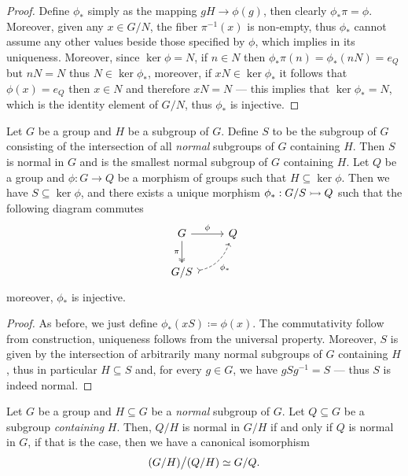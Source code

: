 \begin{proof}
Define \(\phi_{*}\) simply as the mapping \(gH \to \phi(g)\), then clearly
\(\phi_{*} \pi = \phi\). Moreover, given any \(x \in G/N\), the fiber
\(\pi^{-1}(x)\) is non-empty, thus \(\phi_{*}\) cannot assume any other values
beside those specified by \(\phi\), which implies in its uniqueness. Moreover,
since \(\ker \phi = N\), if \(n \in N\) then \(\phi_{*} \pi(n) = \phi_{*}(n N) =
e_{Q}\) but \(n N = N\) thus \(N \in \ker \phi_{*}\), moreover, if \(x N \in
\ker \phi_{*}\) it follows that \(\phi(x) = e_Q\) then \(x \in N\) and therefore
\(x N = N\) --- this implies that \(\ker \phi_{*} = N\), which is the identity
element of \(G/N\), thus \(\phi_{*}\) is injective.
\end{proof}

\begin{corollary}
\label{cor:universal-property-quotients-grp}
Let \(G\) be a group and \(H\) be a subgroup of \(G\). Define \(S\) to be the
subgroup of \(G\) consisting of the intersection of all \emph{normal} subgroups
of \(G\) containing \(H\). Then \(S\) is normal in \(G\) and is the smallest
normal subgroup of \(G\) containing \(H\). Let \(Q\) be a group and \(\phi: G
\to Q\) be a morphism of groups such that \(H \subseteq \ker \phi\). Then we
have \(S \subseteq \ker \phi\), and there exists a unique morphism \(\phi_{*}:
G/S \rightarrowtail Q\) such that the following diagram commutes
\[
  \begin{tikzcd}
    G \ar[d, two heads, swap, "\pi"] \ar[r, "\phi"] &Q \\
    G/S \ar[ur, dashed, swap, bend right, tail, "\phi_{*}"] &
  \end{tikzcd}
\]
moreover, \(\phi_{*}\) is injective.
\end{corollary}

\begin{proof}
As before, we just define \(\phi_{*}(x S) \coloneq \phi(x)\). The commutativity
follow from construction, uniqueness follows from the universal
property. Moreover, \(S\) is given by the intersection of arbitrarily many
normal subgroups of \(G\) containing \(H\), thus in particular \(H \subseteq S\)
and, for every \(g \in G\), we have \(g S g^{-1} = S\) --- thus \(S\) is indeed
normal.
\end{proof}

\begin{corollary}
\label{cor:quotient-isomorphism}
Let \(G\) be a group and \(H \subseteq G\) be a \emph{normal} subgroup of
\(G\). Let \(Q \subseteq G\) be a subgroup \emph{containing} \(H\). Then,
\(Q/H\) is normal in \(G/H\) if and only if \(Q\) is normal in \(G\), if that is
the case, then we have a canonical isomorphism
\[
  (G/H) \big/ (Q/H) \simeq G/Q.
\]
\end{corollary}


